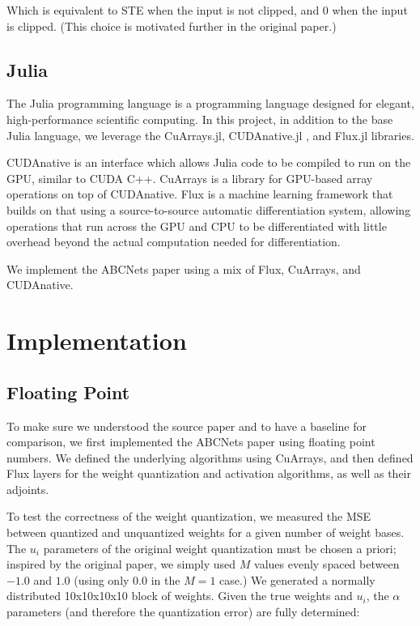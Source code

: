\documentclass[12pt]{article}
\begin{document}
Which is equivalent to STE when the input is not clipped, and 0 when the input is clipped. (This choice is motivated further in the original paper.)

\subsection{Julia}
\label{sec:orgce9fd77}
The Julia programming language \citep{julialang} is a programming language designed for elegant, high-performance scientific computing.
In this project, in addition to the base Julia language, we leverage the CuArrays.jl, CUDAnative.jl \citep{CUDAnativeJL}, and Flux.jl \citep{FluxJL} libraries.

CUDAnative is an interface which allows Julia code to be compiled to run on the GPU, similar to CUDA C++. CuArrays is a library for GPU-based array operations on top of CUDAnative. Flux is a machine learning framework that builds on that using a source-to-source automatic differentiation system, allowing operations that run across the GPU and CPU to be differentiated with little overhead beyond the actual computation needed for differentiation.

We implement the ABCNets paper using a mix of Flux, CuArrays, and CUDAnative.

\section{Implementation}
\label{sec:orgd1a04f1}
\subsection{Floating Point}
\label{sec:org077598e}
To make sure we understood the source paper and to have a baseline for comparison, we first implemented the ABCNets paper using floating
point numbers. We defined the underlying algorithms using CuArrays, and then defined Flux layers for the weight quantization and
activation algorithms, as well as their adjoints.

To test the correctness of the weight quantization, we measured the MSE between quantized
and unquantized weights for a given number of weight bases.
The \(u_i\) parameters of the original weight quantization must be chosen a priori; inspired by the original paper, we simply used \(M\) values evenly spaced between \(-1.0\) and \(1.0\) (using only \(0.0\) in the \(M=1\) case.) We generated a normally distributed 10x10x10x10 block of weights. Given the true weights and \(u_i\), the \(\alpha\) parameters (and therefore the quantization error) are fully determined:
\end{document}
